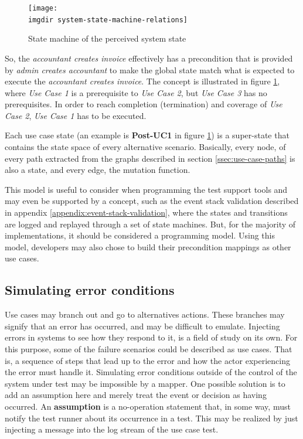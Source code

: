 \begin{figure}[!htbp]
\texttt{[image: \\imgdir system-state-machine-relations]}
\centering
\caption{State machine of the perceived system state}
\label{fig:system-state-machine-relations}
\end{figure}

\noindent 
So, the \emph{accountant creates invoice} effectively has a precondition that is provided by \emph{admin creates accountant} to make the global state match what is expected to execute the \emph{accountant creates invoice}. The concept is illustrated in figure \ref{fig:system-state-machine-relations}, where \emph{Use Case 1} is a prerequisite to \emph{Use Case 2}, but \emph{Use Case 3} has no prerequisites. In order to reach completion (termination) and coverage of \emph{Use Case 2}, \emph{Use Case 1} has to be executed.\smallskip

\noindent Each use case state (an example is \textbf{Post-UC1} in figure \ref{fig:system-state-machine-relations}) is a super-state that contains the state space of every alternative scenario. Basically, every node, of every path extracted from the graphs described in section \ref{ssec:use-case-paths} is also a state, and every edge, the mutation function.\medskip

\noindent This model is useful to consider when programming the test support tools and may even be supported by a concept, such as the event stack validation described in appendix \ref{appendix:event-stack-validation}, where the states and transitions are logged and replayed through a set of state machines. But, for the majority of implementations, it should be considered a programming model. Using this model, developers may also chose to build their precondition mappings as other use cases.

\subsection{Simulating error conditions}
\label{ssec:simulating-error-conditions}
Use cases may branch out and go to alternatives actions. These branches may signify that an error has occurred, and may be difficult to emulate. Injecting errors in systems to see how they respond to it, is a field of study on its own. For this purpose, some of the failure scenarios could be described as use cases. That is, a sequence of steps that lead up to the error and how the actor experiencing the error must handle it. Simulating error conditions outside of the control of the system under test may be impossible by a mapper. One possible solution is to add an assumption here and merely treat the event or decision as having occurred. An \textbf{assumption} is a no-operation statement that, in some way, must notify the test runner about its occurrence in a test. This may be realized by just injecting a message into the log stream of the use case test.

